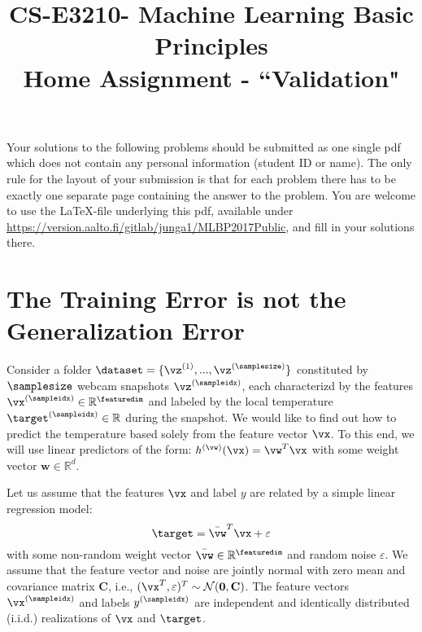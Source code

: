 \documentclass[article,11pt]{article}
\title{CS-E3210- Machine Learning Basic Principles \\
	Home Assignment - ``Validation"}
\newcommand{\mC}[0]{{\bf C}}
\begin{document}
\date{}
\maketitle

Your solutions to the following problems should be submitted as one single pdf which does not contain 
any personal information (student ID or name).  The only rule for the layout of your submission is that for each 
problem there has to be exactly one separate page containing the answer to the problem. You are welcome to use the \LaTeX-file underlying this pdf, 
available under \url{https://version.aalto.fi/gitlab/junga1/MLBP2017Public}, and fill in your solutions there. 




\newpage

\section{The Training Error is not the Generalization Error}
Consider a folder $\dataset = \{\vz^{(1)},...,\vz^{(\samplesize)}\}$ constituted by $\samplesize$ webcam snapshots $\vz^{(\sampleidx)}$, each 
characterizd by the features $\vx^{(\sampleidx)} \in \mathbb{R}^\featuredim$ and labeled by the local temperature $\target^{(\sampleidx)}\in \mathbb{R}$ 
during the snapshot.  We would like to find out how to predict the temperature based solely from the feature vector $\vx$. 
To this end, we will use linear predictors of the form: $h^{(\vw)}(\vx) = \vw^{T} \vx$ with some weight vector $\mathbf{w} \in \mathbb{R}^{d}$. 

Let us assume that the features $\vx$ and label $y$ are related by a simple linear regression model: 
\vspace*{-2mm}
\begin{equation}
\target = \bar{\vw}^{T} \vx +\varepsilon
\vspace*{-1mm}
\end{equation}
with some non-random weight vector $\bar{\vw} \in \mathbb{R}^{\featuredim}$ and random noise $\varepsilon$. 
We assume that the feature vector and noise are jointly normal with zero mean and covariance matrix $\mathbf{C}$, i.e., $(\vx^{T},\varepsilon)^{T} \sim \mathcal{N}(\mathbf{0},\mathbf{C})$.
The feature vectors $\vx^{(\sampleidx)}$ and labels $y^{(\sampleidx)}$ are independent and identically distributed (i.i.d.) realizations of $\vx$ and $\target$. 
\end{document}
